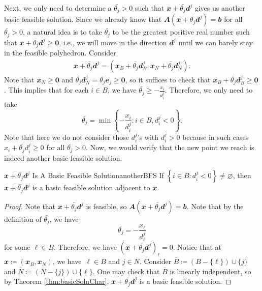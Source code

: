 \documentclass[math, code]{amznotes}
\theoremstyle{remark}
\begin{document}
Next, we only need to determine a $\bar{\theta_j} > 0$ such that $\mathbfit{x} + \bar{\theta_j}\mathbfit{d}^j$ gives us another basic feasible solution. Since we already know that $\mathbfit{A}\left(\mathbfit{x} + \bar{\theta_j}\mathbfit{d}^j\right) = \mathbfit{b}$ for all $\bar{\theta_j} > 0$, a natural idea is to take $\bar{\theta_j}$ to be the greatest positive real number such that $\mathbfit{x} + \bar{\theta_j}\mathbfit{d}^j \geq \mathbf{0}$, i.e., we will move in the direction $\mathbfit{d}^j$ until we can barely stay in the feasible polyhedron. Consider
\begin{align*}
    \mathbfit{x} + \bar{\theta_j}\mathbfit{d}^j = \left(\mathbfit{x}_B + \bar{\theta_j}\mathbfit{d}^j_B, \mathbfit{x}_N + \bar{\theta_j}\mathbfit{d}^j_N\right).
\end{align*}
Note that $\mathbfit{x}_N \geq \mathbf{0}$ and $\bar{\theta_j}\mathbfit{d}^j_N = \bar{\theta_j}\mathbfit{e}_j \geq \mathbf{0}$, so it suffices to check that $\mathbfit{x}_B + \bar{\theta_j}\mathbfit{d}^j_B \geq \mathbf{0}$. This implies that for each $i \in B$, we have $\bar{\theta_j} \geq -\frac{x_i}{d^j_i}$. Therefore, we only need to take
\begin{equation*}
    \bar{\theta_j} = \min\left\{-\frac{x_i}{d^j_i} \colon i \in B, d^j_i < 0\right\}.
\end{equation*}
Note that here we do not consider those $d^j_i$'s with $d^j_i > 0$ because in such cases $x_i + \bar{\theta_j}d^j_i \geq 0$ for all $\bar{\theta_j} > 0$. Now, we would verify that the new point we reach is indeed another basic feasible solution.
\begin{probox}{$\mathbfit{x} + \bar{\theta_j}\mathbfit{d}^j$ Is A Basic Feasible Solution}{anotherBFS}
    If $\left\{i \in B \colon d_i^j < 0\right\} \neq \varnothing$, then $\mathbfit{x} + \bar{\theta_j}\mathbfit{d}^j$ is a basic feasible solution adjacent to $\mathbfit{x}$.
    \tcblower
    \begin{proof}
        Note that $\mathbfit{x} + \bar{\theta_j}\mathbfit{d}^j$ is feasible, so $\mathbfit{A}\left(\mathbfit{x} + \bar{\theta_j}\mathbfit{d}^j\right) = \mathbfit{b}$. Note that by the definition of $\bar{\theta_j}$, we have 
        \begin{equation*}
            \bar{\theta_j} = -\frac{x_{\ell}}{d_{\ell}^j}
        \end{equation*}
        for some $\ell \in B$. Therefore, we have $\left(\mathbfit{x} + \bar{\theta_j}\mathbfit{d}^j\right)_{\ell} = 0$. Notice that at $\mathbfit{x} \coloneqq \left(\mathbfit{x}_B, \mathbfit{x}_N\right)$, we have~$\ell \in B$ and $j \in N$. Consider $\bar{B} \coloneqq (B - \{\ell\}) \cup \{j\}$ and $\bar{N} \coloneqq (N - \{j\}) \cup \{\ell\}$. One may check that $\bar{B}$ is linearly independent, so by Theorem \ref{thm:basicSolnChar}, $\mathbfit{x} + \bar{\theta_j}\mathbfit{d}^j$ is a basic feasible solution.
    \end{proof}
\end{probox}
\end{document}
